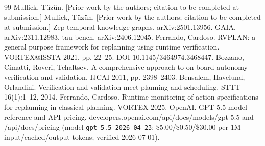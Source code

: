 \documentclass[acmsmall,screen]{acmart}
\begin{document}
\begin{thebibliography}{99}
 Mullick, T\"uz\"un. [Prior work by the authors; citation to be completed at submission.]
 Mullick, T\"uz\"un. [Prior work by the authors; citation to be completed at submission.]
 Zep temporal knowledge graphs. arXiv:2501.13956.
 GAIA. arXiv:2311.12983.
 tau-bench. arXiv:2406.12045.
 Ferrando, Cardoso. RVPLAN: a general purpose framework for replanning using runtime verification. VORTEX@ISSTA 2021, pp. 22--25. DOI 10.1145/3464974.3468447.
 Bozzano, Cimatti, Roveri, Tchaltsev. A comprehensive approach to on-board autonomy verification and validation. IJCAI 2011, pp. 2398--2403.
 Bensalem, Havelund, Orlandini. Verification and validation meet planning and scheduling. STTT 16(1):1--12, 2014.
 Ferrando, Cardoso. Runtime monitoring of action specifications for replanning in classical planning. VORTEX 2025.
 OpenAI. GPT-5.5 model reference and API pricing. developers.openai.com/api/docs/models/gpt-5.5 and /api/docs/pricing (model \texttt{gpt-5.5-2026-04-23}; \$5.00/\$0.50/\$30.00 per 1M input/cached/output tokens; verified 2026-07-01).
\end{thebibliography}
\end{document}
